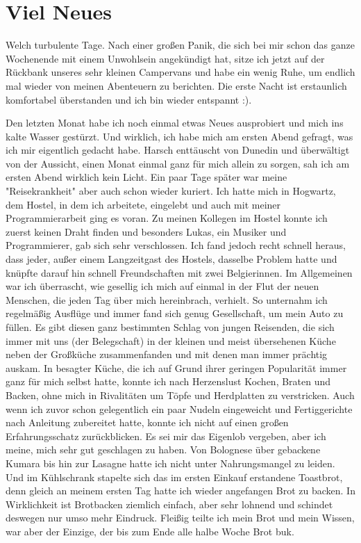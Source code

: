 \chapter{Viel Neues}

Welch turbulente Tage. Nach einer großen Panik, die sich bei mir schon
das ganze Wochenende mit einem Unwohlsein angekündigt hat, sitze ich
jetzt auf der Rückbank unseres sehr kleinen Campervans und habe ein
wenig Ruhe, um endlich mal wieder von meinen Abenteuern zu berichten.
Die erste Nacht ist erstaunlich komfortabel überstanden und ich bin
wieder entspannt :).

Den letzten Monat habe ich noch einmal etwas Neues ausprobiert und mich
ins kalte Wasser gestürzt. Und wirklich, ich habe mich am ersten Abend
gefragt, was ich mir eigentlich gedacht habe. Harsch enttäuscht von
Dunedin und überwältigt von der Aussicht, einen Monat einmal ganz für
mich allein zu sorgen, sah ich am ersten Abend wirklich kein Licht. Ein
paar Tage später war meine "Reisekrankheit" aber auch schon wieder
kuriert. Ich hatte mich in Hogwartz, dem Hostel, in dem ich arbeitete,
eingelebt und auch mit meiner Programmierarbeit ging es voran. Zu meinen
Kollegen im Hostel konnte ich zuerst keinen Draht finden und besonders
Lukas, ein Musiker und Programmierer, gab sich sehr verschlossen. Ich
fand jedoch recht schnell heraus, dass jeder, außer einem Langzeitgast
des Hostels, dasselbe Problem hatte und knüpfte darauf hin schnell
Freundschaften mit zwei Belgierinnen. Im Allgemeinen war ich überrascht,
wie gesellig ich mich auf einmal in der Flut der neuen Menschen, die
jeden Tag über mich hereinbrach, verhielt. So unternahm ich regelmäßig
Ausflüge und immer fand sich genug Gesellschaft, um mein Auto zu füllen.
Es gibt diesen ganz bestimmten Schlag von jungen Reisenden, die sich
immer mit uns (der Belegschaft) in der kleinen und meist übersehenen
Küche neben der Großküche zusammenfanden und mit denen man immer
prächtig auskam. In besagter Küche, die ich auf Grund ihrer geringen
Popularität immer ganz für mich selbst hatte, konnte ich nach
Herzenslust Kochen, Braten und Backen, ohne mich in Rivalitäten um Töpfe
und Herdplatten zu verstricken. Auch wenn ich zuvor schon gelegentlich
ein paar Nudeln eingeweicht und Fertiggerichte nach Anleitung zubereitet
hatte, konnte ich nicht auf einen großen Erfahrungsschatz zurückblicken.
Es sei mir das Eigenlob vergeben, aber ich meine, mich sehr gut
geschlagen zu haben. Von Bolognese über gebackene Kumara bis hin zur
Lasagne hatte ich nicht unter Nahrungsmangel zu leiden. Und im
Kühlschrank stapelte sich das im ersten Einkauf erstandene Toastbrot,
denn gleich an meinem ersten Tag hatte ich wieder angefangen Brot zu
backen. In Wirklichkeit ist Brotbacken ziemlich einfach, aber sehr
lohnend und schindet deswegen nur umso mehr Eindruck. Fleißig teilte ich
mein Brot und mein Wissen, war aber der Einzige, der bis zum Ende alle
halbe Woche Brot buk.

